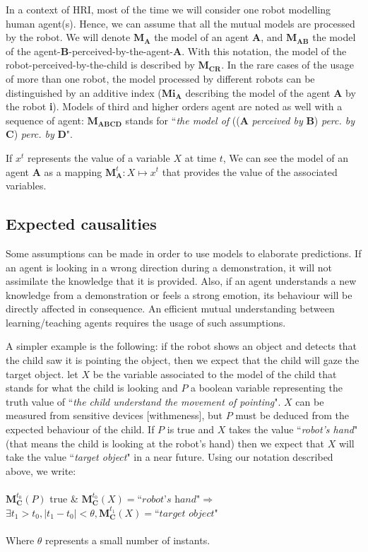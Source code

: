 \documentclass[10pt,a4paper,twocolumn]{article}
\begin{document}
In a context of HRI, most of the time we will consider one robot modelling human agent(s). Hence, we can assume that all the mutual models are processed by the robot. We will denote $\textbf{M}_\textbf{A}$ the model of an agent $\textbf{A}$, and $\textbf{M}_\textbf{AB}$ the model of the agent-\textbf{B}-perceived-by-the-agent-\textbf{A}. With this notation, the model of the robot-perceived-by-the-child is described by $\textbf{M}_\textbf{CR}$. In the rare cases of the usage of more than one robot, the model processed by different robots can be distinguished by an additive index ($\textbf{Mi}_\textbf{A}$ describing the model of the agent \textbf{A} by the robot \textbf{i}). Models of third and higher orders agent are noted as well with a sequence of agent: $\textbf{M}_\textbf{ABCD}$ stands for ``\textit{the model of} ((\textbf{A} \textit{perceived by} \textbf{B}) \textit{perc. by} \textbf{C}) \textit{perc. by} \textbf{D}".

If $x^t$ represents the value of a variable $X$ at time $t$, We can see the model of an agent \textbf{A} as a mapping $\textbf{M}^t_\textbf{A}: X \mapsto x^t$ that provides the value of the associated variables. 

\subsection{Expected causalities}

Some assumptions can be made in order to use models to elaborate predictions. If an agent is looking in a wrong direction during a demonstration, it will not assimilate the knowledge that it is provided. Also, if an agent understands a new knowledge from a demonstration or feels a strong emotion, its behaviour will be directly affected in consequence. An efficient mutual understanding between learning/teaching agents requires the usage of such assumptions.

A simpler example is the following: if the robot shows an object and detects that the child saw it is pointing the object, then we expect that the child will gaze the target object.  let $X$ be the variable associated to the model of the child that stands for what the child is looking and $P$ a boolean variable representing the truth value of ``\textit{the child understand the movement of pointing}". $X$ can be measured from sensitive devices [withmeness], but $P$ must be deduced from the expected behaviour of the child. If $P$ is true and $X$ takes the value ``\textit{robot's hand}" (that means the child is looking at the robot's hand) then we expect that $X$ will take the value ``\textit{target object}" in a near future. Using our notation described above, we write:\\
\\
$\textbf{M}^{t_0}_\textbf{C}(P)$ true \& $\textbf{M}^{t_0}_\textbf{C}(X)=\textit{``robot's hand"} \Rightarrow $\\ $\exists t_1>t_0, |t_1-t_0| < \theta, \textbf{M}^{t_1}_\textbf{C}(X)=\textit{``target object"}$\\
\\
Where $\theta$ represents a small number of instants.
\end{document}
